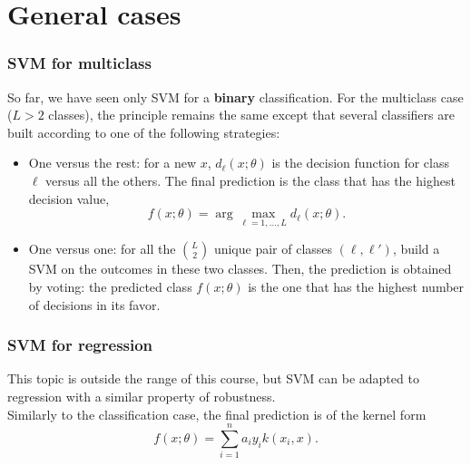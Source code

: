 \section{General cases}
\begin{frame}
\frametitle{SVM for multiclass}
So far, we have seen only SVM for a {\bf binary} classification. For the multiclass case ($L>2$ classes), the principle remains the same except that several classifiers are built according to one of the following strategies:
\begin{itemize}
\item One versus the rest: for a new $x$, $d_\ell(x;\theta)$ is the decision function for class $\ell$ versus all the others.  The final prediction is the class that has the highest decision value,
$$
f(x;\theta) = \arg\max_{\ell=1,\ldots,L} d_\ell(x;\theta).
$$
\item One versus one: for all the $\binom{L}{2}$ unique pair of classes $(\ell,\ell')$, build a SVM on the outcomes in these two classes. Then, the prediction is obtained by voting: the predicted class $f(x;\theta)$ is the one that has the highest number of decisions in its favor.
\end{itemize}
\end{frame}
\begin{frame}
\frametitle{SVM for regression}
This topic is outside the range of this course, but SVM can be adapted to regression with a similar property of robustness.\\
\vspace{0.3cm}
Similarly to the classification case, the final prediction is of the kernel form
$$
f(x;\theta) = \sum_{i=1}^n a_i y_i k(x_i,x).
$$ 
\end{frame}

